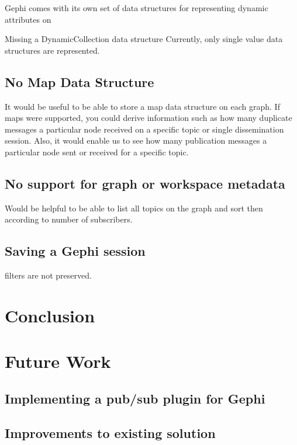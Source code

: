 Gephi comes with its own set of data structures for representing
dynamic attributes on

Missing a DynamicCollection data structure Currently, only single value
data structures are represented.

\subsection{No Map Data Structure}
It would be useful to be able to store a map data structure on each
graph. If maps were supported, you could derive information such as how
many duplicate messages a particular node received on a specific topic
or single dissemination session. Also, it would enable us to see how
many publication messages a particular node sent or received for a
specific topic.

\subsection{No support for graph or workspace metadata}
Would be helpful to be able to list all topics on the graph and sort
then according to number of subscribers.

\subsection{Saving a Gephi session}
filters are not preserved.

\section{Conclusion}
\section{Future Work}
\subsection{Implementing a pub/sub plugin for Gephi}
\subsection{Improvements to existing solution}
